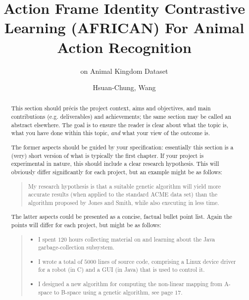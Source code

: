 \documentclass[
]{uob-thesis}
\title{Action Frame Identity Contrastive Learning (AFRICAN) For Animal Action Recognition} %
\subtitle{ on Animal Kingdom Dataset} %
\author{Hsuan-Chung, Wang}
\date{\printdatewithoutmonth{thesisdate}}
\begin{document}

\maketitle
\cleardoubleoddemptypage

\begin{abstract} %


  This section should pr\'{e}cis the project context, aims and objectives,
  and main contributions (e.g. deliverables) and achievements; the same 
  section may be called an abstract elsewhere.  The goal is to ensure the 
  reader is clear about what the topic is, what you have done within this 
  topic, \emph{and} what your view of the outcome is.

  The former aspects should be guided by your specification: essentially 
  this section is a (very) short version of what is typically the first 
  chapter. If your project is experimental in nature, this should include 
  a clear research hypothesis.  This will obviously differ significantly
  for each project, but an example might be as follows:

  \begin{quote}
    My research hypothesis is that a suitable genetic algorithm will yield
    more accurate results (when applied to the standard ACME data set) than 
    the algorithm proposed by Jones and Smith, while also executing in less
    time.
  \end{quote}

  The latter aspects could be presented as a concise, factual bullet point list.
  Again the points will differ for each project, but might be as follows:

  \begin{quote}
    \begin{itemize}
    \item I spent $120$ hours collecting material on and learning about the Java
      garbage-collection subsystem. 
    \item I wrote a total of $5000$ lines of source code, comprising a Linux
      device driver for a robot (in C) and a GUI (in Java) that is used to
      control it.
    \item I designed a new algorithm for computing the non-linear mapping from
      A-space to B-space using a genetic algorithm, see page $17$.
    \end{itemize}
  \end{quote}
\end{abstract}
\end{document}
